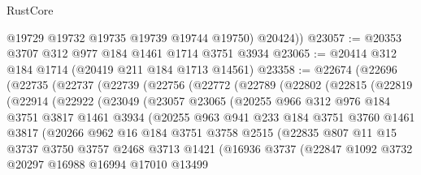 \begin{lexlean}{RustCore}
\begin{coremodule}
          @19729
          @19732
          @19735
          @19739
          @19744
          @19750)
        @20424))
@23057 := @20353 @3707 @312 @977 @184 @1461 @1714 @3751 @3934
@23065 := @20414 @312 @184 @1714 (@20419 @211 @184 @1713 @14561)
@23358 := @22674
    (@22696
      (@22735
        (@22737
          (@22739
            (@22756
              (@22772
                (@22789
                  (@22802
                    (@22815
                      (@22819
                        (@22914
                          (@22922
                            (@23049
                              (@23057
                                @23065
                                (@20255
                                  @966
                                  @312
                                  @976
                                  @184
                                  @3751
                                  @3817
                                  @1461
                                  @3934
                                  (@20255
                                    @963
                                    @941
                                    @233
                                    @184
                                    @3751
                                    @3760
                                    @1461
                                    @3817
                                    (@20266
                                      @962
                                      @16
                                      @184
                                      @3751
                                      @3758
                                      @2515
                                      (@22835
                                        @807
                                        @11
                                        @15
                                        @3737
                                        @3750
                                        @3757
                                        @2468
                                        @3713
                                        @1421
                                        (@16936
                                          @3737
                                          (@22847
                                            @1092
                                            @3732
                                            @20297
                                            @16988
                                            @16994
                                            @17010
                                            @13499

\end{coremodule}
\end{lexlean}
